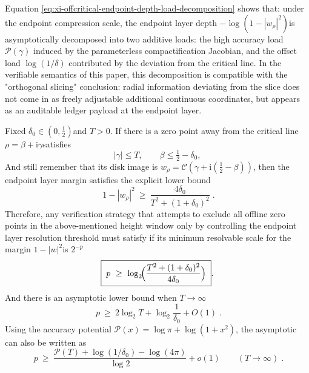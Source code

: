 \begin{remark}\label{rem:xi-offcritical-endpoint-depth-additive-load}
Equation \eqref{eq:xi-offcritical-endpoint-depth-load-decomposition} shows that: under the endpoint compression scale, the endpoint layer depth \(-\log(1-|w_\rho|^2)\) ​​is asymptotically decomposed into two additive loads: the high accuracy load \(\mathcal{P}(\gamma)\) induced by the parameterless compactification Jacobian, and the offset load \(\log(1/\delta)\) contributed by the deviation from the critical line.
In the verifiable semantics of this paper, this decomposition is compatible with the "orthogonal slicing" conclusion: radial information deviating from the slice does not come in as freely adjustable additional continuous coordinates, but appears as an auditable ledger payload at the endpoint layer.
\end{remark}

\begin{theorem}\label{thm:xi-offcritical-endpoint-resolution-lower-bound}
Fixed \(\delta_0\in(0,\tfrac12)\) ​​and \(T>0\).
If there is a zero point away from the critical line \(\rho=\beta+\mathrm{i}\gamma\) ​​satisfies
\[
|\gamma|\le T,\qquad \beta\le \tfrac12-\delta_0,
\]
And still remember that its disk image is \(w_\rho=\mathcal{C}(\gamma+\mathrm{i}(\tfrac12-\beta))\), then the endpoint layer margin satisfies the explicit lower bound
\begin{equation}\label{eq:xi-offcritical-endpoint-margin-min}
\boxed{\;
1-|w_\rho|^2\ \ge\ \frac{4\delta_0}{T^2+(1+\delta_0)^2}\; }.
\end{equation}
Therefore, any verification strategy that attempts to exclude all offline zero points in the above-mentioned height window only by controlling the endpoint layer resolution threshold must satisfy if its minimum resolvable scale for the margin \(1-|w|^2\) ​​is \(2^{-p}\)
\begin{equation}\label{eq:xi-offcritical-endpoint-bit-lower-bound}
\boxed{\;
p\ \ge\ \log_2\!\Bigl(\frac{T^2+(1+\delta_0)^2}{4\delta_0}\Bigr)\; }.
\end{equation}
And there is an asymptotic lower bound when \(T\to\infty\)
\begin{equation}\label{eq:xi-offcritical-endpoint-bit-asymptotic}
\boxed{\;
p\ \ge\ 2\log_2 T+\log_2\!\frac{1}{\delta_0}+O(1)\; }.
\end{equation}
Using the accuracy potential \(\mathcal{P}(x)=\log\pi+\log(1+x^2)\), the asymptotic can also be written as
\begin{equation}\label{eq:xi-offcritical-endpoint-bit-precision-potential-form}
\boxed{\;
p\ \ge\ \frac{\mathcal{P}(T)+\log(1/\delta_0)-\log(4\pi)}{\log 2}+o(1)\qquad(T\to\infty)\; }.
\end{equation}
\end{theorem}

